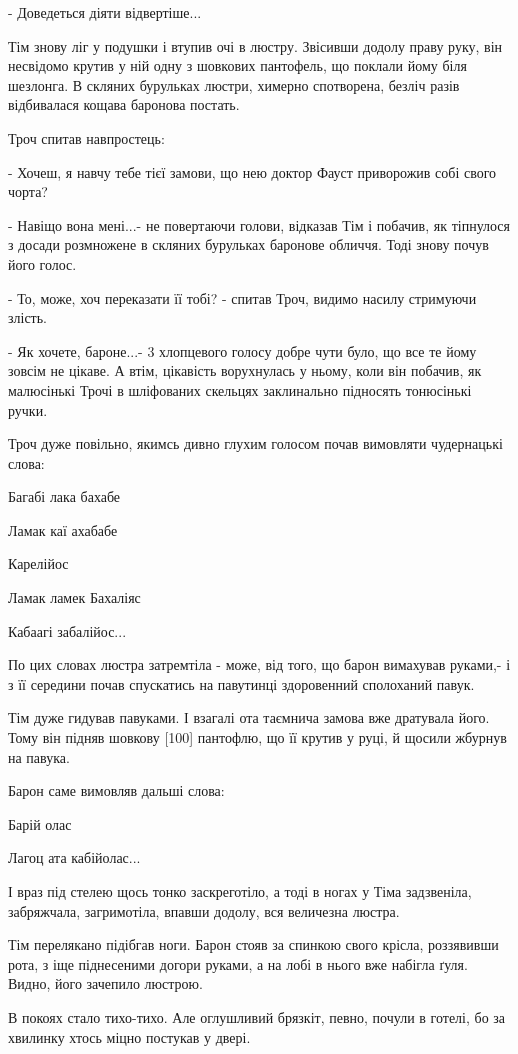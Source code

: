 - Доведеться діяти відвертіше...

Тім знову ліг у подушки і втупив очі в люстру. Звісивши додолу праву руку, він несвідомо крутив у ній одну з шовкових пантофель, що поклали йому біля шезлонга. В скляних бурульках люстри, химерно спотворена, безліч разів відбивалася кощава баронова постать.

Троч спитав навпростець:

- Хочеш, я навчу тебе тієї замови, що нею доктор Фауст приворожив собі свого чорта?

- Навіщо вона мені...- не повертаючи голови, відказав Тім і побачив, як тіпнулося з досади розмножене в скляних бурульках баронове обличчя. Тоді знову почув його голос.

- То, може, хоч переказати її тобі? - спитав Троч, видимо насилу стримуючи злість.

- Як хочете, бароне...- 3 хлопцевого голосу добре чути було, що все те йому зовсім не цікаве. А втім, цікавість ворухнулась у ньому, коли він побачив, як малюсінькі Трочі в шліфованих скельцях заклинально підносять тонюсінькі ручки.

Троч дуже повільно, якимсь дивно глухим голосом почав вимовляти чудернацькі слова:

Багабі лака бахабе

Ламак каї ахабабе

Карелійос

Ламак ламек Бахаліяс

Кабаагі забалійос...

По цих словах люстра затремтіла - може, від того, що барон вимахував руками,- і з її середини почав спускатись на павутинці здоровенний сполоханий павук.

Тім дуже гидував павуками. І взагалі ота таємнича замова вже дратувала його. Тому він підняв шовкову [100] пантофлю, що її крутив у руці, й щосили жбурнув на павука.

Барон саме вимовляв дальші слова:

Барій олас

Лагоц ата кабійолас...

І враз під стелею щось тонко заскреготіло, а тоді в ногах у Тіма задзвеніла, забряжчала, загримотіла, впавши додолу, вся величезна люстра.

Тім перелякано підібгав ноги. Барон стояв за спинкою свого крісла, роззявивши рота, з іще піднесеними догори руками, а на лобі в нього вже набігла ґуля. Видно, його зачепило люстрою.

В покоях стало тихо-тихо. Але оглушливий брязкіт, певно, почули в готелі, бо за хвилинку хтось міцно постукав у двері.


